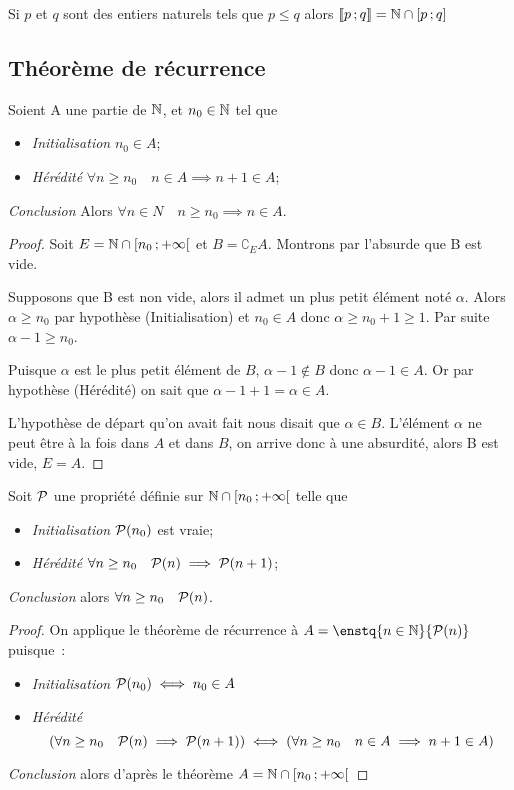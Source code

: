  Si $p$ et $q$ sont des entiers naturels tels que $p\leq q$ alors $\intervalleentier{p}{q}= \N\cap\intervalleff{p}{q}$ 

\subsection{Théorème de récurrence}

\begin{theo}
  \label{theo:rec}
  Soient A une partie de $\N$, et $n_0\in\N$ tel que
  \begin{itemize}
  \item \emph{Initialisation} $n_0\in A$;
  \item \emph{Hérédité} $\forall n\geq n_0 \quad n\in A \implies n+1\in A$;
  \end{itemize}
  \emph{Conclusion} Alors $\forall n \in N \quad n\geq n_0 \implies n \in A$.
\end{theo}
\begin{proof}
  Soit $E=\N\cap \intervallefo{n_0}{+\infty}$ et $B=\complement_E A$. Montrons par l'absurde que B est vide. 

Supposons que B est non vide, alors il admet un plus petit élément noté $\alpha$. Alors $\alpha\geq n_0$ par hypothèse (Initialisation) et $n_0\in A$ donc $\alpha\geq n_0+1\geq 1$. Par suite $\alpha-1\geq n_0$. 

Puisque $\alpha$ est le plus petit élément de $B$, $\alpha-1 \notin B$ donc $\alpha-1 \in A$. Or par hypothèse (Hérédité) on sait que $\alpha-1+1=\alpha\in A$. 

L'hypothèse de départ qu'on avait fait nous disait que $\alpha \in B$. L'élément $\alpha$ ne peut être à la fois dans $A$ et dans $B$, on arrive donc à une absurdité, alors B est vide, $E=A$.
\end{proof}
\begin{cor}
  \label{cor:recsimple}
  Soit $\P$ une propriété définie sur $\N\cap \intervallefo{n_0}{+\infty}$ telle que
  \begin{itemize}
  \item \emph{Initialisation} $\P(n_0)$ est vraie;
  \item \emph{Hérédité}  $\forall n\geq n_0 \quad \P(n) \implies \P(n+1)$;
  \end{itemize}
  \emph{Conclusion} alors $\forall n\geq n_0 \quad \P(n)$.
\end{cor}
\begin{proof}
  On applique le théorème de récurrence à $A=\enstq{n\in\N}{\P(n)}$ puisque~:
  \begin{itemize}
  \item \emph{Initialisation} $\P(n_0) \iff n_0 \in A$
  \item \emph{Hérédité}
    \begin{equation}
      \left(\forall n\geq n_0 \quad \P(n) \implies \P(n+1)\right) \iff \left( \forall n \geq n_0 \quad n\in A \implies n+1\in A\right)
    \end{equation}
  \end{itemize}
  \emph{Conclusion} alors d'après le théorème $A=\N\cap \intervallefo{n_0}{+\infty}$
\end{proof}
